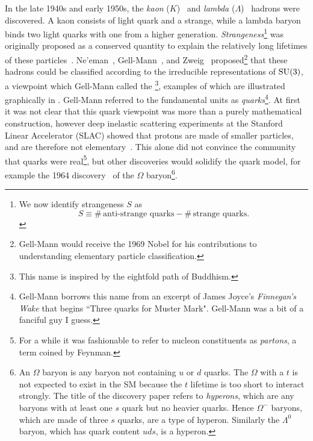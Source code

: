 In the late 1940s and early 1950s, the {\it kaon} ($K$)~\cite{rochester_evidence_1947}
 and {\it lambda} ($\Lambda$)~\cite{hopper_evidence_1950}
 hadrons were discovered. A kaon
consists of light quark and a strange, while a lambda baryon binds two light
quarks with one from a higher generation. {\it Strangeness}\footnote{We now 
identify strangeness $S$ as
$$
  S\equiv\#\,\text{anti-strange quarks}-\#\,\text{strange quarks}.
$$}
was originally proposed as a conserved quantity to explain the relatively long
lifetimes of these particles~\cite{pais_remarks_1952,gell-mann_isotopic_1953,
pais_baryon-meson-photon_1953,tadao_charge_1953}.
Ne'eman~\cite{neeman_derivation_1961},
Gell-Mann~\cite{gell-mann_symmetries_1962}, and
Zweig~\cite{zweig_su3_1964} proposed\footnote{Gell-Mann would receive the 1969
Nobel for his contributions to understanding elementary particle
classification.} that these hadrons could be classified
according to the irreducible representations of $\operatorname{SU}(3)$, a viewpoint which
Gell-Mann called the \footnote{This
name is inspired by the eightfold path of Buddhism.}, examples of which are
illustrated graphically in . Gell-Mann
referred to the fundamental units as {\it quarks}\footnote{Gell-Mann borrows
this name from an excerpt of James Joyce's {\it Finnegan's Wake} that begins
``Three quarks for Muster Mark".
Gell-Mann was a bit of a fanciful guy I guess.}.
At first it was not clear that this quark viewpoint was more than a
purely mathematical construction, however deep inelastic
scattering
experiments at the Stanford Linear Accelerator (SLAC) showed that
protons are made of smaller particles, and are therefore not
elementary~\cite{bloom_high-energy_1969,breidenbach_observed_1969}.
This alone did not convince the community that quarks were 
real\footnote{For a while it was fashionable to refer to 
nucleon constituents as {\it partons}, a term coined
by Feynman.}, but
other discoveries would solidify the quark model,
for example the 1964 discovery~\cite{barnes_observation_1964} 
of the 
$\Omega$ baryon\footnote{An $\Omega$ baryon is any baryon not
containing $u$ or $d$ quarks. The $\Omega$ with a $t$ is not expected
to exist in the SM because the $t$ lifetime is too short to
interact strongly. The title of the discovery paper refers 
to {\it hyperons}, which are any baryons with
at least one $s$ quark but no heavier quarks. 
Hence $\Omega^{-}$ baryons, which are made of three $s$ quarks,
are a type of hyperon. Similarly the $\Lambda^0$
baryon, which has quark content $uds$,
is a hyperon.}.

